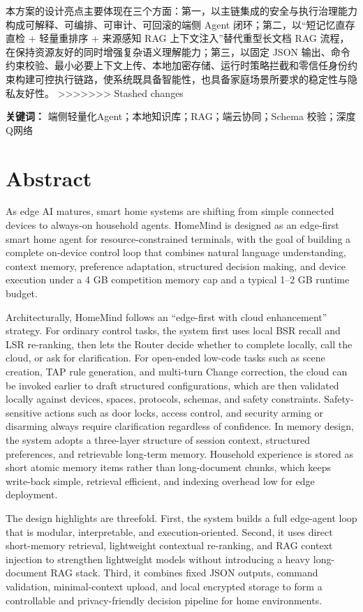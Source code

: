 \documentclass[12pt,a4paper,oneside]{ctexrep}
\begin{document}
本方案的设计亮点主要体现在三个方面：第一，以主链集成的安全与执行治理能力构成可解释、可编排、可审计、可回滚的端侧 Agent 闭环；第二，以“短记忆直存直检 + 轻量重排序 + 来源感知 RAG 上下文注入”替代重型长文档 RAG 流程，在保持资源友好的同时增强复杂语义理解能力；第三，以固定 JSON 输出、命令约束校验、最小必要上下文上传、本地加密存储、运行时策略拦截和零信任身份约束构建可控执行链路，使系统既具备智能性，也具备家庭场景所要求的稳定性与隐私友好性。
>>>>>>> Stashed changes

\vspace{1em}
\noindent\textbf{关键词：} 端侧轻量化Agent；本地知识库；RAG；端云协同；Schema 校验；深度Q网络

\chapter*{Abstract}

As edge AI matures, smart home systems are shifting from simple connected devices to always-on household agents. HomeMind is designed as an edge-first smart home agent for resource-constrained terminals, with the goal of building a complete on-device control loop that combines natural language understanding, context memory, preference adaptation, structured decision making, and device execution under a 4 GB competition memory cap and a typical 1--2 GB runtime budget.

Architecturally, HomeMind follows an “edge-first with cloud enhancement” strategy. For ordinary control tasks, the system first uses local BSR recall and LSR re-ranking, then lets the Router decide whether to complete locally, call the cloud, or ask for clarification. For open-ended low-code tasks such as scene creation, TAP rule generation, and multi-turn Change correction, the cloud can be invoked earlier to draft structured configurations, which are then validated locally against devices, spaces, protocols, schemas, and safety constraints. Safety-sensitive actions such as door locks, access control, and security arming or disarming always require clarification regardless of confidence. In memory design, the system adopts a three-layer structure of session context, structured preferences, and retrievable long-term memory. Household experience is stored as short atomic memory items rather than long-document chunks, which keeps write-back simple, retrieval efficient, and indexing overhead low for edge deployment.

The design highlights are threefold. First, the system builds a full edge-agent loop that is modular, interpretable, and execution-oriented. Second, it uses direct short-memory retrieval, lightweight contextual re-ranking, and RAG context injection to strengthen lightweight models without introducing a heavy long-document RAG stack. Third, it combines fixed JSON outputs, command validation, minimal-context upload, and local encrypted storage to form a controllable and privacy-friendly decision pipeline for home environments.
\end{document}
